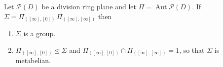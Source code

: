 Let $\mathcal{P}(D)$ be a division ring plane and let $\Pi = \operatorname{Aut}\mathcal{P}(D)$. If $\Sigma = \Pi_{([\infty], [0])} \, \Pi_{([\infty], [\infty])}$ then
\begin{enumerate}
\item[(i)] $\Sigma$ is a group.
\item[(ii)] $\Pi_{([\infty], [0])} \trianglelefteq \Sigma$ and $\Pi_{([\infty], [0])} \cap \Pi_{([\infty], [\infty])} = 1$, so that $\Sigma$ is metabelian.
\end{enumerate}
